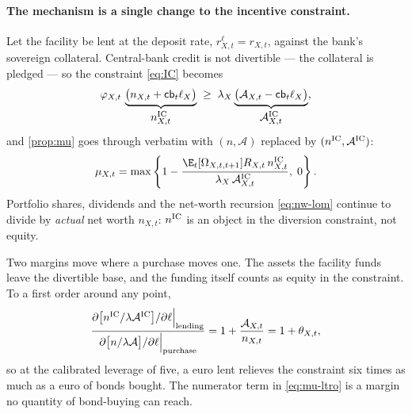 \paragraph{The mechanism is a single change to the incentive constraint.} Let the
facility be lent at the deposit rate, $r^{\ell}_{X,t}=r_{X,t}$, against the bank's
sovereign collateral. Central-bank credit is not divertible --- the collateral is
pledged --- so the constraint \eqref{eq:IC} becomes
\begin{equation}
\varphi_{X,t}\,\underbrace{\bigl(n_{X,t}+\mathsf{cb}_t\ell_X\bigr)}_{\textstyle n^{\rm IC}_{X,t}}
\;\ge\;
\lambda_X\underbrace{\bigl(\mathcal{A}_{X,t}-\mathsf{cb}_t\ell_X\bigr)}_{\textstyle \mathcal{A}^{\rm IC}_{X,t}},
\label{eq:IC-ltro}
\end{equation}
and \cref{prop:mu} goes through verbatim with $(n,\mathcal{A})$ replaced by
$(n^{\rm IC},\mathcal{A}^{\rm IC})$:
\begin{equation}
\mu_{X,t}=\max\left\{1-\frac{\E_t[\Omega_{X,t,t+1}]R_{X,t}\,n^{\rm IC}_{X,t}}
                            {\lambda_X\,\mathcal{A}^{\rm IC}_{X,t}},\;0\right\}.
\label{eq:mu-ltro}
\end{equation}
Portfolio shares, dividends and the net-worth recursion \eqref{eq:nw-lom}
continue to divide by \emph{actual} net worth $n_{X,t}$: $n^{\rm IC}$ is an object
in the diversion constraint, not equity.

Two margins move where a purchase moves one. The assets the facility funds leave
the divertible base, and the funding itself counts as equity in the constraint.
To a first order around any point,
\begin{equation}
\frac{\partial\bigl[n^{\rm IC}/\lambda\mathcal{A}^{\rm IC}\bigr]/\partial\ell
      \Big|_{\text{lending}}}
     {\partial\bigl[n/\lambda\mathcal{A}\bigr]/\partial\ell
      \Big|_{\text{purchase}}}
=1+\frac{\mathcal{A}_{X,t}}{n_{X,t}}
=1+\theta_{X,t},
\label{eq:relief-ratio}
\end{equation}
so at the calibrated leverage of five, a euro lent relieves the constraint six
times as much as a euro of bonds bought. The numerator term in
\eqref{eq:mu-ltro} is a margin no quantity of bond-buying can reach.

